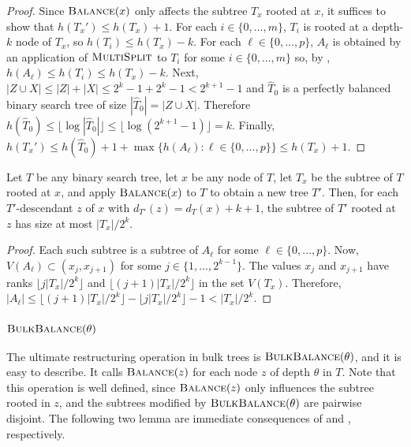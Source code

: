 \documentclass[kpfonts]{patmorin}
\let\le\leqslant
\begin{document}
\begin{proof}
  Since $\textsc{Balance}(x)$ only affects the subtree $T_x$ rooted at $x$, it suffices to show that $h(T_x')\le h(T_x)+1$.  For each $i\in\{0,\ldots, m\}$, $T_i$ is rooted at a depth-$k$ node of $T_x$, so $h(T_i)\le h(T_x)-k$. For each $\ell \in\{0,\ldots,p\}$, $A_\ell$ is obtained by an application of $\textsc{MultiSplit}$ to $T_i$ for some $i\in\{0,\ldots,m\}$ so, by , $h(A_\ell)\le h(T_i)\le h(T_x)-k$.  Next, $|Z\cup X|\le |Z|+|X| \le 2^k-1 + 2^k-1 < 2^{k+1}-1$ and $\hat{T}_0$ is a perfectly balanced binary search tree of size $|\hat{T}_0|=|Z\cup X|$.  Therefore $h(\hat{T}_0)\le \lfloor\log|\hat{T}_0|\rfloor\le \lfloor\log(2^{k+1}-1)\rfloor = k$.  Finally, $h(T_x')\le h(\hat{T}_0)+1 +\max \{h(A_\ell):\ell\in\{0,\ldots,p\}\} \le h(T_x)+1$.  
\end{proof}

\begin{lem}
  Let $T$ be any binary search tree, let $x$ be any node of $T$, let $T_x$ be the subtree of $T$ rooted at $x$, and apply $\textsc{Balance}(x)$ to $T$ to obtain a new tree $T'$.  Then, for each $T'$-descendant $z$ of $x$ with $d_{T'}(z)=d_{T}(x)+k+1$, the subtree of $T'$ rooted at $z$ has size at most $|T_x|/2^k$.
\end{lem}

\begin{proof}
  Each such subtree is a subtree of $A_\ell$ for some $\ell\in\{0,\ldots,p\}$. Now, $V(A_\ell)\subset (x_j,x_{j+1})$ for some $j\in\{1,\ldots,2^{k-1}\}$.  The values $x_j$ and $x_{j+1}$ have ranks $\lfloor j|T_x|/2^k\rfloor$ and $\lfloor (j+1)|T_x|/2^k\rfloor$ in the set $V(T_x)$.  Therefore, $|A_\ell|\le \lfloor (j+1)|T_x|/2^k\rfloor- \lfloor j|T_x|/2^k\rfloor -1 < |T_x|/2^k$.
\end{proof}

\subsubsection{$\textsc{BulkBalance}(\theta)$}

The ultimate restructuring operation in bulk trees is $\textsc{BulkBalance}(\theta)$, and it is easy to describe.  It calls $\textsc{Balance}(z)$ for each node $z$ of depth $\theta$ in $T$. Note that this operation is well defined, since $\textsc{Balance}(z)$ only influences the subtree rooted in $z$, and the subtrees modified by $\textsc{BulkBalance}(\theta)$ are pairwise disjoint.
The following two lemma are immediate consequences of  and , respectively.
\end{document}

